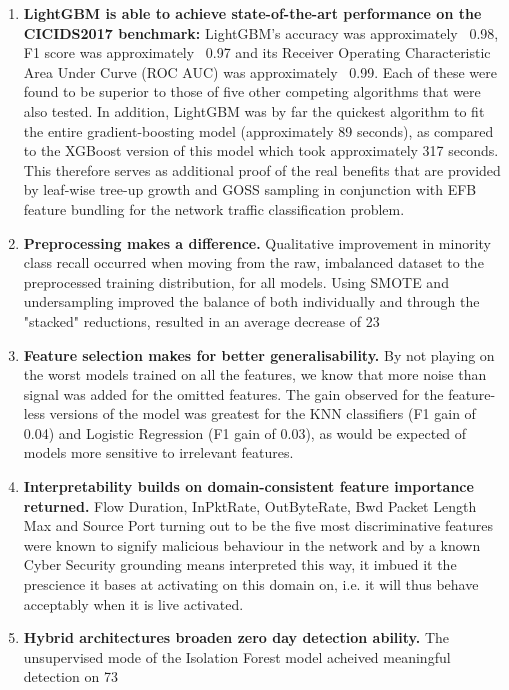 \begin{enumerate}

\item \textbf{LightGBM is able to achieve state-of-the-art performance on the CICIDS2017 benchmark: } LightGBM’s accuracy was approximately ~0.98, F1 score was approximately ~0.97 and its Receiver Operating Characteristic Area Under Curve (ROC AUC) was approximately ~0.99. Each of these were found to be superior to those of five other competing algorithms that were also tested. In addition, LightGBM was by far the quickest algorithm to fit the entire gradient-boosting model (approximately 89 seconds), as compared to the XGBoost version of this model which took approximately 317 seconds. This therefore serves as additional proof of the real benefits that are provided by leaf-wise tree-up growth and GOSS sampling in conjunction with EFB feature bundling for the network traffic classification problem.
\item \textbf{Preprocessing makes a difference.} Qualitative improvement in minority class recall occurred when moving from the raw, imbalanced dataset to the preprocessed training distribution, for all models. Using SMOTE and undersampling improved the balance of both individually and through the "stacked" reductions, resulted in an average decrease of 23%
\item \textbf{Feature selection makes for better generalisability.} By not playing on the worst models trained on all the features, we know that more noise than signal was added for the omitted features. The gain observed for the feature-less versions of the model was greatest for the KNN classifiers (F1 gain of 0.04) and Logistic Regression (F1 gain of 0.03), as would be expected of models more sensitive to irrelevant features.
\item \textbf{Interpretability builds on domain-consistent feature importance returned.} Flow Duration, InPktRate, OutByteRate, Bwd Packet Length Max and Source Port turning out to be the five most discriminative features were known to signify malicious behaviour in the network and by a known Cyber Security grounding means interpreted this way, it imbued it the prescience it bases at activating on this domain on, i.e. it will thus behave acceptably when it is live activated.
\item \textbf{Hybrid architectures broaden zero day detection ability.} The unsupervised mode of the Isolation Forest model acheived meaningful detection on 73%

\end{enumerate}
